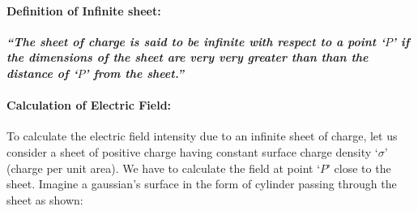 \paragraph{Definition of Infinite sheet:}
\textit{\textbf{“The sheet of charge is said to be infinite with respect
to a point `$P$' if the dimensions of the sheet are very very greater
than than the distance of `$P$' from the sheet.”}}
\paragraph{Calculation of Electric Field:}
To calculate the electric field intensity due to an infinite
sheet of charge, let us consider a sheet of positive charge having
constant surface charge density `$\sigma$’ (charge per unit area).
We have to calculate the field at point `$P$’ close to the sheet.
Imagine a gaussian’s surface in the form of cylinder passing through
the sheet as shown:

